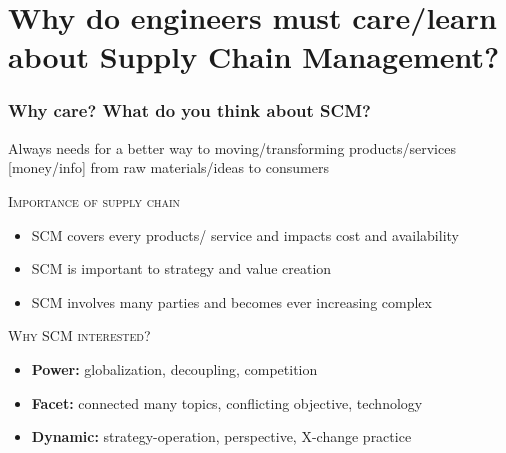\documentclass[10pt,handout]{beamer}
\begin{document}
\section[SCM \& me]{Why do engineers must care/learn about Supply Chain Management?}
\begin{frame}[label=why_care]
  \frametitle{Why care? What do you think about SCM? }

  \begin{alertblock}{}{}
     Always needs for a better way to \alert{moving/transforming} products/services [money/info] from raw materials/ideas to consumers \hfill \hyperlink{trade}{}
  \end{alertblock}

  \NextLine
  \textsc{Importance of supply chain}
  \begin{itemize}
    \item SCM covers every \alert{products/ service} and impacts \alert{cost} and \alert{availability}
    \item SCM is important to \alert{strategy} and \alert{value creation}
    \item SCM involves \alert{many parties} and becomes ever increasing \alert{complex}
  \end{itemize}

  \NextLine
  \textsc{Why SCM interested?}
  \begin{itemize}
    \item<2-> \textbf{Power:} globalization, decoupling, \alert{competition} \hfill \hyperlink{stat}{}
    \item<2-> \textbf{Facet:} connected many topics, conflicting objective, \alert{technology} \hfill  \hyperlink{multiDis}{}
    \item<2-> \textbf{Dynamic:} strategy-operation, perspective, X-change practice       \hfill  \hyperlink{dynamics}{}
  \end{itemize}


\end{frame}
\end{document}
